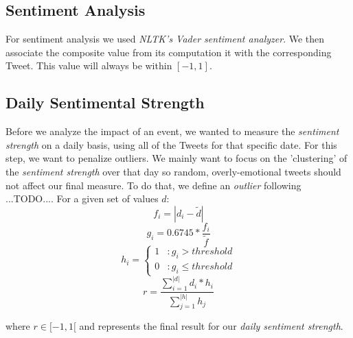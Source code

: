 \documentclass[11pt]{article}
\begin{document}
	\subsection{Sentiment Analysis}
	\label{sub:sentiment_analysis}
	For sentiment analysis we used \textit{NLTK's Vader sentiment analyzer}. We then associate the composite value from its computation it with the corresponding Tweet. This value will always be within $[-1, 1]$.
	
	\subsection{Daily Sentimental Strength}
	\label{sub:daily_sentiment_strength}
	Before we analyze the impact of an event, we wanted to measure the \textit{sentiment strength} on a daily basis, using all of the Tweets for that specific date. For this step, we want to penalize outliers. We mainly want to focus on the 'clustering' of the \textit{sentiment strength} over that day so random, overly-emotional tweets should not affect our final measure.
	To do that, we define an \textit{outlier} following ...TODO.... For a given set of values $d$:
	\begin{equation}
	f_{i} = |d_{i} - \tilde{d}|
	\end{equation} 
	\begin{equation}
	g_{i} = 0.6745 * \frac{f_{i}}{\tilde{f}}
	\end{equation}
	\begin{equation}
	h_{i} = \left\{
	\begin{array}{lr}
	1 & : g_{i} > threshold\\
	0 & : g_{i} \leq threshold
	\end{array}
	\right.
	\end{equation}
	\begin{equation}
	r = \frac{\sum_{i=1}^{|d|} d_{i} * h_{i}}{\sum_{j=1}^{|h|} h_{j}}
	\end{equation} 
	
	where $r \in [-1, 1[$ and represents the final result for our \textit{daily sentiment strength}.
	
\end{document}
